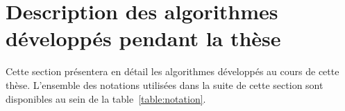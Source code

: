 \documentclass[\main/main.tex]{subfiles}
\begin{document}
\chapter{Description des algorithmes développés pendant la thèse}

Cette section présentera en détail les algorithmes développés au cours de cette thèse.
%
L'ensemble des notations utilisées dans la suite de cette section sont disponibles au sein de la table~\ref{table:notation}.




\end{document}

